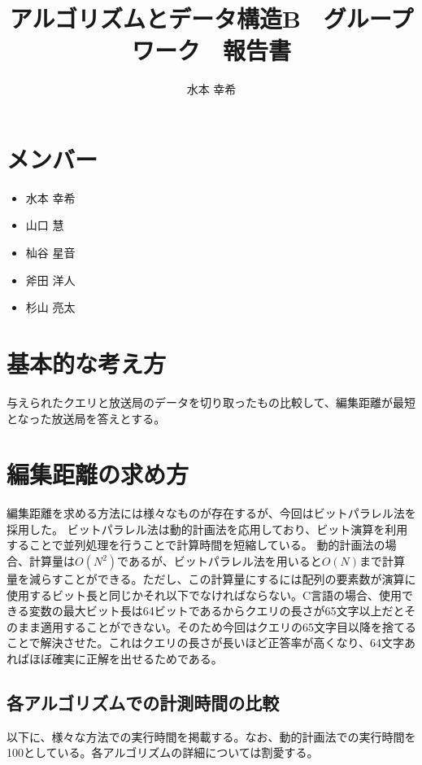 \documentclass[dvipdfmx]{jsarticle}
\begin{document}
\lstset{
    frame=single,
    numbers=left
}

\title{アルゴリズムとデータ構造B　グループワーク　報告書}
\author{水本 幸希}
\maketitle

\section{メンバー}
\begin{itemize}
  \item 水本 幸希
  \item 山口 慧
  \item 杣谷 星音
  \item 斧田 洋人
  \item 杉山 亮太
\end{itemize}

\section{基本的な考え方}
与えられたクエリと放送局のデータを切り取ったもの比較して、編集距離が最短となった放送局を答えとする。

\section{編集距離の求め方}

編集距離を求める方法には様々なものが存在するが、今回はビットパラレル法を採用した。
ビットパラレル法は動的計画法を応用しており、ビット演算を利用することで並列処理を行うことで計算時間を短縮している。
動的計画法の場合、計算量は$O(N^2)$であるが、ビットパラレル法を用いると$O(N)$まで計算量を減らすことができる。ただし、この計算量にするには配列の要素数が演算に使用するビット長と同じかそれ以下でなければならない。C言語の場合、使用できる変数の最大ビット長は64ビットであるからクエリの長さが65文字以上だとそのまま適用することができない。そのため今回はクエリの65文字目以降を捨てることで解決させた。これはクエリの長さが長いほど正答率が高くなり、64文字あればほぼ確実に正解を出せるためである。

\subsection{各アルゴリズムでの計測時間の比較}
以下に、様々な方法での実行時間を掲載する。なお、動的計画法での実行時間を100としている。各アルゴリズムの詳細については割愛する。
\end{document}
